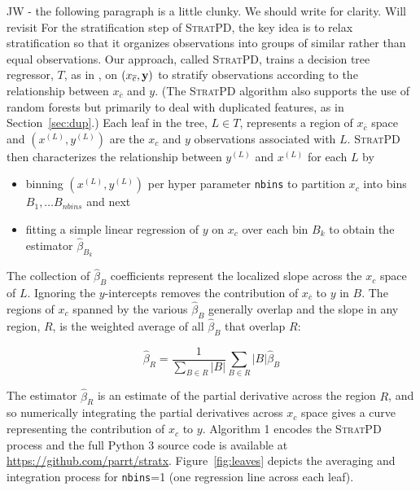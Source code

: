 \documentclass[12pt]{article}
\newcommand{\secref}[1]{Section~\ref{#1}}
\newcommand{\figref}[1]{Figure~\ref{#1}}
\newcommand{\spd}{\fontfamily{cmr}\textsc{\small StratPD}}
\newcommand{\xnc}{$x_{\overline{c}}$}
\begin{document}
{\color{red} JW - the following paragraph is a little clunky. We should write for clarity. Will revisit}
For the stratification step of \spd{}, the key idea is to relax stratification so that it organizes observations into groups of similar rather than equal observations. Our approach, called \spd, trains a decision tree regressor, $T$, as in \cite{CART}, on $(x_{\overline{c}}, {\bf y})$ to stratify observations according to the relationship between \xnc{} and $y$.  (The \spd{} algorithm also supports the use of random forests \cite{RF} but primarily to deal with duplicated features, as in \secref{sec:dup}.)  Each leaf in the tree, $L \in T$, represents a region of \xnc{} space and $(x^{(L)}, y^{(L)})$ are the $x_c$ and $y$ observations associated with $L$. \spd{} then characterizes the relationship between $y^{(L)}$ and $x^{(L)}$ for each $L$ by 
\begin{itemize}
	\item binning $(x^{(L)}, y^{(L)})$ per hyper parameter \texttt{nbins} to partition $x_c$ into bins $B_1, \ldots B_{nbins}$ and next
	\item fitting a simple linear regression of $y$ on $x_c$ over each bin $B_k$ to obtain the estimator $\widehat{\beta}_{B_k}$
\end{itemize}

The collection of $\widehat{\beta}_{B}$ coefficients represent the localized slope across the $x_c$ space of $L$. Ignoring the $y$-intercepts removes the contribution of \xnc{} to $y$ in $B$. The regions of $x_c$ spanned by the various $\widehat{\beta}_{B}$ generally overlap and the slope in any region, $R$, is the weighted average of all $\widehat{\beta}_{B}$ that overlap $R$:

\begin{equation}\label{eq:slope}
\widehat{\beta}_R = \frac{1}{\displaystyle\sum_{B \in R} |B|}\displaystyle\sum_{B \in R}|B|\widehat{\beta}_{B}
\end{equation}

The estimator $\widehat{\beta}_R$ is an estimate of the partial derivative across the region $R$, and so numerically integrating the partial derivatives across $x_c$ space gives a curve representing the contribution of $x_c$ to $y$.  Algorithm 1 encodes the \spd{} process and the full Python 3 source code is available at {\small \url{https://github.com/parrt/stratx}}. \figref{fig:leaves} depicts the averaging and integration process for {\tt nbins}=1 (one regression line across each leaf).  
\end{document}
